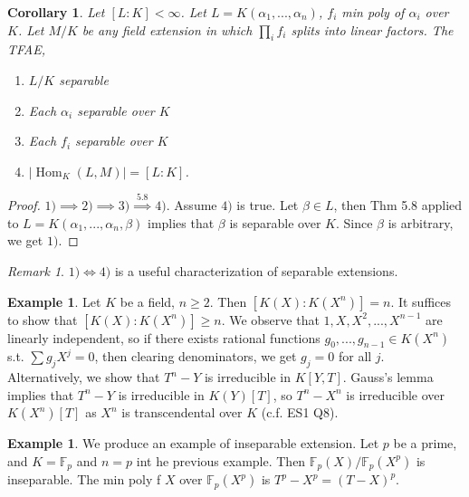 \documentclass{article}
\theoremstyle{definition}
\newtheorem{example}[defn]{Example}
\theoremstyle{remark}
\newtheorem{rem}{Remark}
\theoremstyle{plain}
\newtheorem{crly}[defn]{Corollary}
\newcommand{\FF}{\mathbb{F}}
\newcommand{\Hom}{\operatorname{Hom}}
\begin{document}
\begin{crly}
    Let $[L:K]<\infty$. Let $L=K(\alpha_1,...,\alpha_n)$, $f_i$ min poly of $\alpha_i$ over $K$. Let $M/K$ be any field extension in which $\prod_if_i$ splits into linear factors. The TFAE,
    \begin{enumerate}
        \item $L/K$ separable
        \item Each $\alpha_i$ separable over $K$
        \item Each $f_i$ separable over $K$
        \item $|\Hom_K(L,M)|=[L:K]$.
    \end{enumerate}
\end{crly}
\begin{proof}
    $1)\implies 2)\implies 3)\overset{5.8}{\implies}4)$. 
    Assume $4)$ is true. Let $\beta\in L$, then Thm 5.8 applied to $L=K(\alpha_1,...,\alpha_n,\beta)$ implies that $\beta$ is separable over $K$. Since $\beta$ is arbitrary, we get $1)$.
\end{proof}
\begin{rem}
    $1)\Leftrightarrow 4)$ is a useful characterization of separable extensions.
\end{rem}
\begin{example}
    Let $K$ be a field, $n\ge 2$. Then $[K(X):K(X^n)]=n$. It suffices to show that $[K(X):K(X^n)]\ge n$. We observe that $1,X,X^2,...,X^{n-1}$ are linearly independent, so if there exists rational functions $g_0,...,g_{n-1}\in K(X^n)$ s.t. $\sum g_jX^j=0$, then clearing denominators, we get $g_j=0$ for all $j$. Alternatively, we show that $T^n-Y$ is irreducible in $K[Y,T]$. Gauss's lemma implies that $T^n-Y$ is irreducible in $K(Y)[T]$, so $T^n-X^n$ is irreducible over $K(X^n)[T]$ as $X^n$ is transcendental over $K$ (c.f. ES1 Q8).
\end{example}
\begin{example}
    We produce an example of inseparable extension. Let $p$ be a prime, and $K=\FF_p$ and $n=p$ int he previous example. Then $\FF_p(X)/\FF_p(X^p)$ is inseparable. The min poly f $X$ over $\FF_p(X^p)$ is $T^p-X^p=(T-X)^p$.
\end{example}
\end{document}
